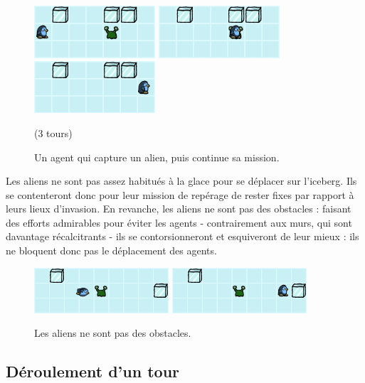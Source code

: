 \begin{figure}[!h]
    \centering
    \includegraphics[width=4.5cm]{img/alien_capture1}
    \includegraphics[width=4.5cm]{img/alien_capture2}
    \includegraphics[width=4.5cm]{img/alien_capture3}
    \vspace{-0.3cm}
    \caption*{(3 tours)}
    \caption*{Un agent qui capture un alien, puis continue sa mission.}
\end{figure}

Les aliens ne sont pas assez habitués à la glace pour se déplacer sur
l'iceberg. Ils se contenteront donc pour leur mission de repérage de
rester fixes par rapport à leurs lieux d'invasion. En revanche, les
aliens ne sont pas des obstacles : faisant des efforts admirables pour
éviter les agents - contrairement aux murs, qui sont davantage
récalcitrants - ils se contorsionneront et esquiveront de leur mieux :
ils ne bloquent donc pas le déplacement des agents.

\begin{figure}[!h]
    \centering
    \includegraphics[width=5cm]{img/alien_not_obstacle1}
    \hspace{0.5cm}
    \includegraphics[width=5cm]{img/alien_not_obstacle2}
    \caption*{Les aliens ne sont pas des obstacles.}
\end{figure}

\subsection{Déroulement d'un tour}\label{duxe9roulement-dun-tour}


